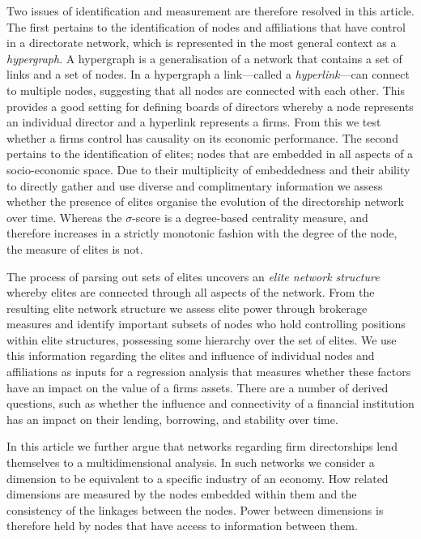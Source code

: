 \documentclass[11pt,fleqn]{article}
\begin{document}
Two issues of identification and measurement are therefore resolved in this article. The first pertains to the identification of nodes and affiliations that have control in a directorate network, which is represented in the most general context as a \emph{hypergraph}. A hypergraph is a generalisation of a network that contains a set of links and a set of nodes. In a hypergraph a link---called a \emph{hyperlink}---can connect to multiple nodes, suggesting that all nodes are connected with each other. This provides a good setting for defining boards of directors whereby a node represents an individual director and a hyperlink represents a firms. From this we test whether a firms control has causality on its economic performance. The second pertains to the identification of elites; nodes that are embedded in all aspects of a socio-economic space. Due to their multiplicity of embeddedness and their ability to directly gather and use diverse and complimentary information we assess whether the presence of elites organise the evolution of the directorship network over time. Whereas the $\sigma$-score is a degree-based centrality measure, and therefore increases in a strictly monotonic fashion with the degree of the node, the measure of elites is not.

The process of parsing out sets of elites uncovers an \emph{elite network structure} whereby elites are connected through all aspects of the network. From the resulting elite network structure we assess elite power through brokerage measures and identify important subsets of nodes who hold controlling positions within elite structures, possessing some hierarchy over the set of elites. We use this information regarding the elites and influence of individual nodes and affiliations as inputs for a regression analysis that measures whether these factors have an impact on the value of a firms assets. There are a number of derived questions, such as whether the influence and connectivity of a financial institution has an impact on their lending, borrowing, and stability over time.

In this article we further argue that networks regarding firm directorships lend themselves to a multidimensional analysis. In such networks we consider a dimension to be equivalent to a specific industry of an economy. How related dimensions are measured by the nodes embedded within them and the consistency of the linkages between the nodes. Power between dimensions is therefore held by nodes that have access to information between them.
\end{document}
